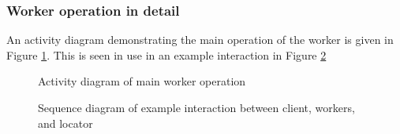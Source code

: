 \subsubsection{Worker operation in detail}

An activity diagram demonstrating the main operation of the worker is given in Figure \ref{fig:workerops}.
This is seen in use in an example interaction in Figure \ref{fig:sysinteract}

\begin{figure}

\caption{Activity diagram of main worker operation}
\label{fig:workerops}
\end{figure}

\begin{figure}

\caption{Sequence diagram of example interaction between client, workers, and locator}
\label{fig:sysinteract}
\end{figure}
